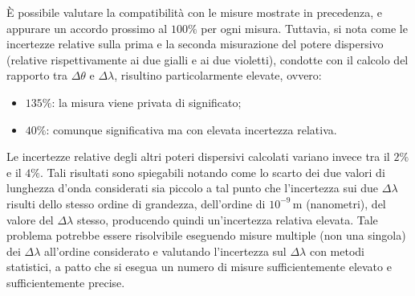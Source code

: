 \documentclass[a4paper,12pt]{article}
\begin{document}
È possibile valutare la compatibilità con le misure mostrate in precedenza, e appurare un accordo prossimo al \( 100\% \) per ogni misura. Tuttavia, si nota come le incertezze relative sulla prima e la seconda misurazione del potere dispersivo (relative rispettivamente ai due gialli e ai due violetti), condotte con il calcolo del rapporto tra \( \Delta\theta \) e \( \Delta\lambda \), risultino particolarmente elevate, ovvero:
\begin{itemize}
    \item\( 135\% \): la misura viene privata di significato;
    \item\( 40\% \): comunque significativa ma con elevata incertezza relativa.
\end{itemize}
Le incertezze relative degli altri poteri dispersivi calcolati variano invece tra il \( 2\% \) e il \( 4\% \).
Tali risultati sono spiegabili notando come lo scarto dei due valori di lunghezza d’onda considerati sia piccolo a tal punto che l’incertezza sui due \( \Delta\lambda \) risulti dello stesso ordine di grandezza, dell’ordine di \( 10^{-9} \, \text{m} \) (nanometri), del valore del \( \Delta\lambda \) stesso, producendo quindi un’incertezza relativa elevata.
Tale problema potrebbe essere risolvibile eseguendo misure multiple (non una singola) dei \( \Delta\lambda \) all’ordine considerato e valutando l’incertezza sul \( \Delta\lambda \) con metodi statistici, a patto che si esegua un numero di misure sufficientemente elevato e sufficientemente precise.
\end{document}
